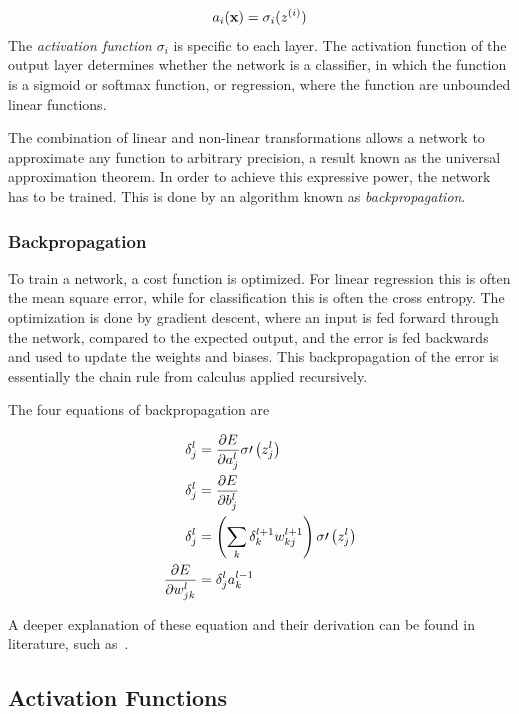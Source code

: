 \begin{align*}
  a_{i}(\vb{x}) = \sigma_{i}(z^{(i)})
\end{align*}
The \textit{activation function } \(\sigma_{i}\) is specific to each layer. 
The activation function of the output layer determines whether the network is a
classifier, in which the function is a sigmoid or softmax function, or regression,
where the function are unbounded linear functions.

The combination of linear and non-linear transformations allows a network to
approximate any function to arbitrary precision, a result known as the universal
approximation theorem\cite{mehta}. In order to achieve this expressive power,
the network has to be trained. This is done by an algorithm known as
\textit{backpropagation}.

\subsubsection{Backpropagation}

To train a network, a cost function is optimized. For linear regression this is
often the mean square error, while for classification this is often the cross
entropy. The optimization is done by gradient descent, where an input is fed
forward through the network, compared to the expected output, and the error is
fed backwards and used to update the weights and biases. This backpropagation of
the error is essentially the chain rule from calculus applied recursively.

The four equations of backpropagation are

\begin{align*}
  \delta_{j}^{l} &= \pdv{E}{a_{j}^{l}}\sigma\prime\left( z_{j}^{l} \right)\\
  \delta_{j}^{l} &= \pdv{E}{b_{j}^{l}}\\
  \delta_{j}^{l} &= \left( \sum_{k}\delta_{k}^{l+1}w_{kj}^{l+1} \right)\sigma\prime\left( z_{j}^{l} \right)\\
  \pdv{E}{w_{jk}^{l}} &= \delta_{j}^{l}a_{k}^{l-1}
\end{align*}

A deeper explanation of these equation and their derivation can be found in
literature, such as~\cite{mehta}.


\subsection{Activation Functions}

